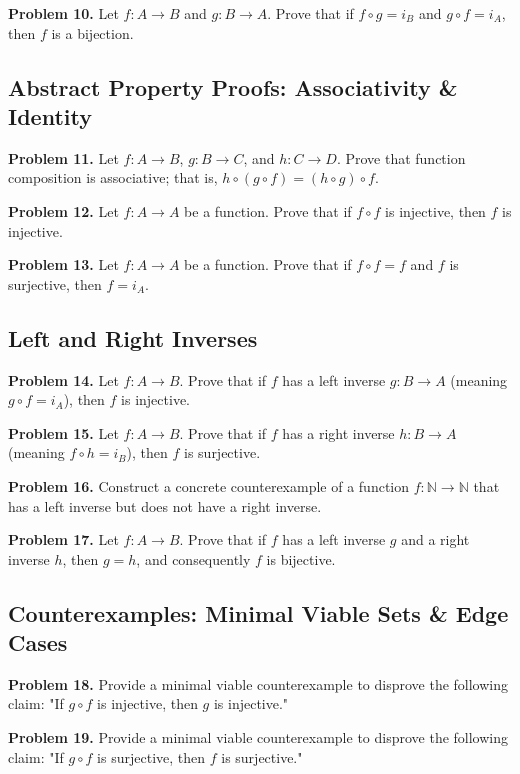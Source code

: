 \documentclass[11pt, letterpaper]{article}
\theoremstyle{definition}
\theoremstyle{remark}
\newcommand{\N}{\mathbb{N}}
\begin{document}
\textbf{Problem 10.} Let $f: A \to B$ and $g: B \to A$. Prove that if $f \circ g = i_B$ and $g \circ f = i_A$, then $f$ is a bijection.

\subsection{Abstract Property Proofs: Associativity \& Identity}

\textbf{Problem 11.} Let $f: A \to B$, $g: B \to C$, and $h: C \to D$. Prove that function composition is associative; that is, $h \circ (g \circ f) = (h \circ g) \circ f$.

\textbf{Problem 12.} Let $f: A \to A$ be a function. Prove that if $f \circ f$ is injective, then $f$ is injective.

\textbf{Problem 13.} Let $f: A \to A$ be a function. Prove that if $f \circ f = f$ and $f$ is surjective, then $f = i_A$.

\subsection{Left and Right Inverses}

\textbf{Problem 14.} Let $f: A \to B$. Prove that if $f$ has a left inverse $g: B \to A$ (meaning $g \circ f = i_A$), then $f$ is injective.

\textbf{Problem 15.} Let $f: A \to B$. Prove that if $f$ has a right inverse $h: B \to A$ (meaning $f \circ h = i_B$), then $f$ is surjective.

\textbf{Problem 16.} Construct a concrete counterexample of a function $f: \N \to \N$ that has a left inverse but does not have a right inverse.

\textbf{Problem 17.} Let $f: A \to B$. Prove that if $f$ has a left inverse $g$ and a right inverse $h$, then $g = h$, and consequently $f$ is bijective.

\subsection{Counterexamples: Minimal Viable Sets \& Edge Cases}

\textbf{Problem 18.} Provide a minimal viable counterexample to disprove the following claim: "If $g \circ f$ is injective, then $g$ is injective."

\textbf{Problem 19.} Provide a minimal viable counterexample to disprove the following claim: "If $g \circ f$ is surjective, then $f$ is surjective."
\end{document}
